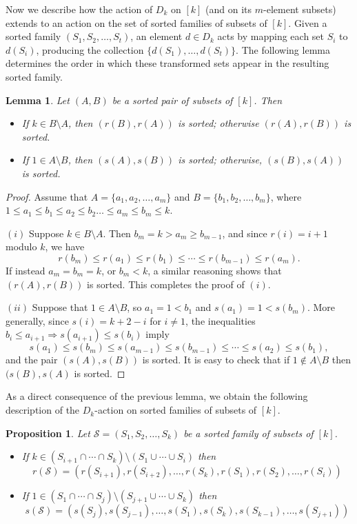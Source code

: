 \documentclass{birkjour}
\newtheorem{lem}[thm]{Lemma}
\newtheorem{prop}[thm]{Proposition}
\theoremstyle{definition}
\theoremstyle{remark}
\numberwithin{equation}{section}
\begin{document}
 Now we describe how the action of $D_k$ on $[k]$
(and on its $m$-element subsets) extends to an action on the set
of sorted families of subsets of $[k]$. Given a sorted family
$(S_1,S_2,\ldots,S_t)$, an element $d\in D_k$ acts by mapping each
set $S_i$ to $d(S_i)$, producing the collection
$\{d(S_1),\ldots,d(S_t)\}$. The following lemma determines the
order in which these transformed sets appear in the resulting
sorted family.
\begin{lem} Let $(A,B)$ be a
sorted pair of subsets of $[k]$. Then
\begin{itemize}
    \item[(i)] If $k\in B\setminus A$, then $(r(B),r(A))$ is sorted;
    otherwise $(r(A),r(B))$ is sorted.
    \item[(ii)] If $1\in A\setminus B$, then $(s(A),s(B))$ is
sorted; otherwise, $(s(B),s(A))$ is sorted.
\end{itemize}
\end{lem}
\begin{proof}Assume that
$A=\{a_1,a_2,\ldots,a_m\}$ and $B=\{b_1,b_2,\ldots,b_m\}$, where
$1\leq a_1\leq b_1\leq a_2\leq b_2\ldots\leq a_m\leq b_m\leq k$.

\noindent $(i)$ Suppose $k\in B\setminus A$. Then $b_m=k>a_m\geq
b_{m-1}$, and since $r(i)=i+1$ modulo $k$, we have $$r(b_m)\leq
r(a_1)\leq r(b_1)\leq \cdots \leq r(b_{m-1})\leq r(a_m).$$ If
instead $a_m=b_m=k$, or $b_m<k$, a similar reasoning shows that
$(r(A),r(B))$ is sorted. This completes the proof of $(i)$.

\noindent $(ii)$ Suppose that $1\in A\setminus B$, so $a_1=1<b_1$
and $s(a_1)=1<s(b_m)$. More generally, since $s(i)=k+2-i$ for
$i\neq 1$, the inequalities $b_i\leq a_{i+1}\Rightarrow
s(a_{i+1})\leq s(b_i)$ imply
$$s(a_1)\leq s(b_m)\leq s(a_{m-1})\leq s(b_{m-1})\leq
\cdots\leq s(a_2)\leq s(b_1),$$ and the pair $(s(A),s(B))$ is
sorted. It is easy to check that if $1\notin A\setminus B$ then
$(s(B),s(A)$ is sorted.
\end{proof}
As a direct consequence of the previous lemma, we obtain the
following description of the $D_k$-action on sorted families of
subsets of $[k]$.
\begin{prop}\label{dejstvonasort} Let $\mathcal S=(S_1,S_2,\ldots,S_k)$
be a sorted family of subsets of $[k]$.
\begin{itemize}
    \item[(a)] If $k\in (S_{i+1}\cap
    \cdots\cap S_k)\setminus (S_1\cup\cdots\cup
S_i)$ then \[r(\mathcal S)=(r(S_{i+1}),r(S_{i+2}),\ldots,
r(S_k),r(S_1),r(S_2),\ldots,r(S_i))\]
    \item[(b)] If $1\in (S_1\cap\cdots\cap S_j)\setminus
(S_{j+1}\cup\cdots\cup S_k)$ then \[s(\mathcal
S)=(s(S_{j}),s(S_{j-1}),\ldots,
s(S_1),s(S_{k}),s(S_{k-1}),\ldots,s(S_{j+1}))\]
\end{itemize}
\end{prop}
\end{document}
